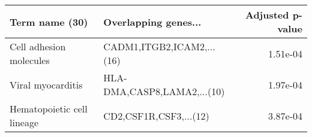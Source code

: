 \begin{tabular}{llr}
\toprule
            Term name (30) &        Overlapping genes... &  Adjusted p-value \\
\midrule
   Cell adhesion molecules &   CADM1,ITGB2,ICAM2,...(16) &          1.51e-04 \\
         Viral myocarditis & HLA-DMA,CASP8,LAMA2,...(10) &          1.97e-04 \\
Hematopoietic cell lineage &      CD2,CSF1R,CSF3,...(12) &          3.87e-04 \\
\bottomrule
\end{tabular}

